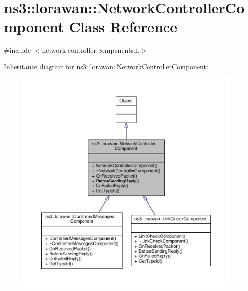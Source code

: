 \hypertarget{classns3_1_1lorawan_1_1NetworkControllerComponent}{}\section{ns3\+:\+:lorawan\+:\+:Network\+Controller\+Component Class Reference}
\label{classns3_1_1lorawan_1_1NetworkControllerComponent}


{\ttfamily \#include $<$network-\/controller-\/components.\+h$>$}



Inheritance diagram for ns3\+:\+:lorawan\+:\+:Network\+Controller\+Component\+:
\nopagebreak
\begin{figure}[H]
\begin{center}
\leavevmode
\includegraphics[width=350pt]{classns3_1_1lorawan_1_1NetworkControllerComponent__inherit__graph}
\end{center}
\end{figure}


